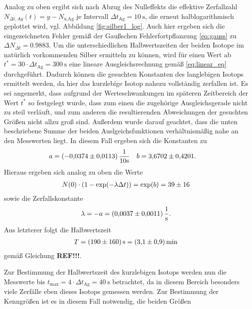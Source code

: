 \noindent
Analog zu oben ergibt sich nach Abzug des Nulleffekts die effektive Zerfallzahl 
$N_{\Delta t,Ag}(t) = y- N_\text{u,Ag}$ je Intervall $\Delta t_\text{Ag} = \qty[]{10}{\second}$,
die erneut halblogarithmisch geplottet wird, vgl. Abbildung \ref{fig:silber1_log}.
Auch hier ergeben sich die eingezeichneten Fehler gemäß der Gaußschen Fehlerfortpflanzung \eqref{eq:gauss} zu $\Delta N_{\Delta t} = \num{0.9883}$.
Um die unterschiedlichen Halbwertszeiten der beiden Isotope im natürlich vorkommenden Silber ermitteln zu können, wird für einen Wert ab 
$t^* = 30 \cdot \Delta t_\text{Ag} = \qty[]{300}{\second}$ eine lineare Ausgleichsrechnung gemäß \eqref{eq:linear_eq} durchgeführt.
Dadurch können die gesuchten Konstanten des langlebigen Isotops ermittelt werden, da hier das kurzlebige Isotop nahezu vollständig zerfallen ist.
Es sei angemerkt, dass aufgrund der Werteschwankungen im späteren Zeitbereich der Wert $t^*$ so festgelegt wurde, 
dass zum einen die zugehörige Ausgleichsgerade nicht zu steil verläuft,
und zum anderen die resultierenden Abweichungen der gesuchten Größen nicht allzu groß sind.
Außerdem wurde darauf geachtet, dass die unten beschriebene Summe der beiden Auslgeichsfunktionen verhältnismäßig nahe an den Messwerten liegt.
In diesem Fall ergeben sich die Konstanten zu 
\begin{align}
    a &= (\num{-0.0374 +- 0.0113}) \, \frac{1}{10 \unit{\second}}  & b &= \num{3.6702 +- 0.4201}.
\end{align}
Hieraus ergeben sich analog zu oben die Werte 
\begin{align}
    N(0) \cdot \left(1- \exp(- \lambda \Delta t)\right) = \exp(b) = \num[]{39 +- 16}
\end{align}
sowie die Zerfallskonstante 
\begin{align}
    \lambda = - a = \qty[]{0.0037 +- 0.0011}{\per\second}.
\end{align}
Aus letzterer folgt die Halbwertszeit 
\begin{align}
    T = \qty[]{190 +- 160}{\second} = \qty[]{3.1 +- 0.9}{\minute}
\end{align}
gemäß Gleichung \textbf{REF!!!}.





\noindent
Zur Bestimmung der Halbwertszeit des kurzlebigen Isotops werden nun die Messwerte bis $t_\text{max} = 4 \cdot \Delta t_\text{Ag} = \qty[]{40}{\second}$ betrachtet,
da in diesem Bereich besonders viele Zerfälle eben dieses Isotops gemessen werden.
Zur Bestimmung der Kenngrößen ist es in diesem Fall notwendig, die beiden Größen 

